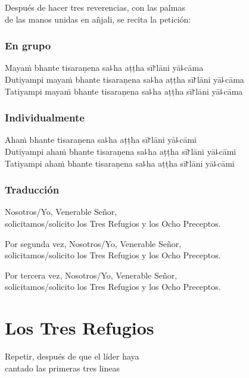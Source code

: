 \begin{instruction}
  Después de hacer tres reverencias, con las palmas\\
  de las manos unidas en añjali, se recita la petición:
\end{instruction}

\subsection{En grupo}

Mayaṁ bhante tisaraṇena sa꜕ha aṭṭha sī꜓lāni yā꜕cāma\\
Dutiyampi mayaṁ bhante tisaraṇena sa꜕ha aṭṭha sī꜓lāni yā꜕cāma\\
Tatiyampi mayaṁ bhante tisaraṇena sa꜕ha aṭṭha sī꜓lāni yā꜕cāma

\subsection{Individualmente}

Ahaṁ bhante tisaraṇena sa꜕ha aṭṭha sī꜓lāni yā꜕cāmi\\
Dutiyampi ahaṁ bhante tisaraṇena sa꜕ha aṭṭha sī꜓lāni yā꜕cāmi\\
Tatiyampi ahaṁ bhante tisaraṇena sa꜕ha aṭṭha sī꜓lāni yā꜕cāmi

\subsection{Traducción}

\begin{english}
  Nosotros/Yo, Venerable Señor,\\
  \vin solicitamos/solicito los Tres Refugios y los Ocho Preceptos.

  Por segunda vez, Nosotros/Yo, Venerable Señor,\\
  \vin solicitamos/solicito los Tres Refugios y los Ocho Preceptos.

  Por tercera vez, Nosotros/Yo, Venerable Señor,\\
  \vin solicitamos/solicito los Tres Refugios y los Ocho Preceptos.
\end{english}

\clearpage
\chapter{Los Tres Refugios}

\begin{instruction}
  Repetir, después de que el líder haya\\
  cantado las primeras tres lineas
\end{instruction}

